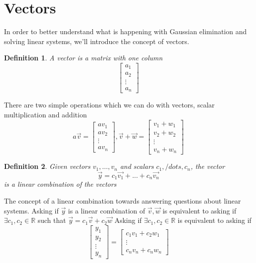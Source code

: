 \documentclass{article}
\newtheorem{definition}{Definition}
\begin{document}
    \section{Vectors}
    In order to better understand what is happening with Gaussian elimination and solving linear systems, we'll introduce the concept of vectors.
    \begin{definition}
        A vector is a matrix with one column
        \[
        \left[
            \begin{array}{c}
                a_1\\
                a_2\\
                \vdots\\
                a_n
            \end{array}
        \right]
        \]
    \end{definition}
    There are two simple operations which we can do with vectors, scalar multiplication and addition
    \[ a\vec{v}=
        \left[
            \begin{array}{c}
                av_1\\
                av_2\\
                \vdots\\
                av_n
            \end{array}
        \right],
        \vec{v}+\vec{w} = \left[
            \begin{array}{c}
                v_1+w_1\\
                v_2+w_2\\
                \vdots\\
                v_n+w_n
            \end{array}
            \right]
        \]
    \begin{definition}
        Given vectors $v_1,\dots,v_n$ and scalars $c_1,/dots,c_n$, the vector $$\vec{y} = c_1\vec{v_1}+...+c_n\vec{v_n}$$ is a linear combination of the vectors
    \end{definition}
    The concept of a linear combination towards answering questions about linear systems.
    Asking if $\vec{y}$ is a linear combination of $\vec{v}, \vec{w}$ is equivalent to asking if $\exists c_1, c_2\in \mathbb{R}$ such that $\vec{y}=c_1\vec{v}+c_2\vec{w}$
    Asking if $\exists c_1, c_2\in \mathbb{R}$ is equivalent to asking if
    \[
        \left[
            \begin{array}{c}
                y_1\\
                y_2\\
                \vdots\\
                y_n
            \end{array}
        \right] = \left[
            \begin{array}{c}
                c_1v_1+c_2w_1\\
                \vdots\\
                c_nv_n+c_nw_n
            \end{array}
        \right]
        \]
\end{document}
